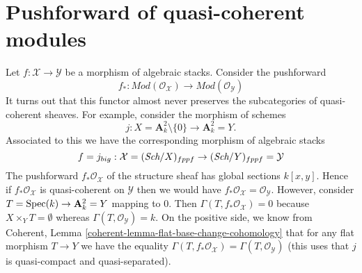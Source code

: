 \section{Pushforward of quasi-coherent modules}
\label{section-pushforward-quasi-coherent}

\noindent
Let $f : \mathcal{X} \to \mathcal{Y}$ be a morphism of algebraic stacks.
Consider the pushforward
$$
f_* :
\textit{Mod}(\mathcal{O}_\mathcal{X})
\longrightarrow
\textit{Mod}(\mathcal{O}_\mathcal{Y})
$$
It turns out that this functor almost never preserves the subcategories
of quasi-coherent sheaves. For example, consider the morphism of schemes
$$
j : X = \mathbf{A}^2_k \setminus \{0\} \longrightarrow \mathbf{A}^2_k = Y.
$$
Associated to this we have the corresponding morphism of algebraic stacks
$$
f = j_{big} : \mathcal{X} = (\textit{Sch}/X)_{fppf} \to
(\textit{Sch}/Y)_{fppf} = \mathcal{Y}
$$
The pushforward $f_*\mathcal{O}_\mathcal{X}$ of the structure sheaf has
global sections $k[x, y]$. Hence if $f_*\mathcal{O}_\mathcal{X}$ is
quasi-coherent on $\mathcal{Y}$ then we would have
$f_*\mathcal{O}_\mathcal{X} = \mathcal{O}_\mathcal{Y}$. However,
consider $T = \mathop{\rm Spec}(k) \to \mathbf{A}^2_k = Y$ mapping to $0$.
Then $\Gamma(T, f_*\mathcal{O}_\mathcal{X}) = 0$ because
$X \times_Y T = \emptyset$ whereas $\Gamma(T, \mathcal{O}_\mathcal{Y}) = k$.
On the positive side, we know from
Coherent, Lemma \ref{coherent-lemma-flat-base-change-cohomology}
that for any flat morphism $T \to Y$ we have the equality
$\Gamma(T, f_*\mathcal{O}_\mathcal{X}) = \Gamma(T, \mathcal{O}_\mathcal{Y})$
(this uses that $j$ is quasi-compact and quasi-separated).

